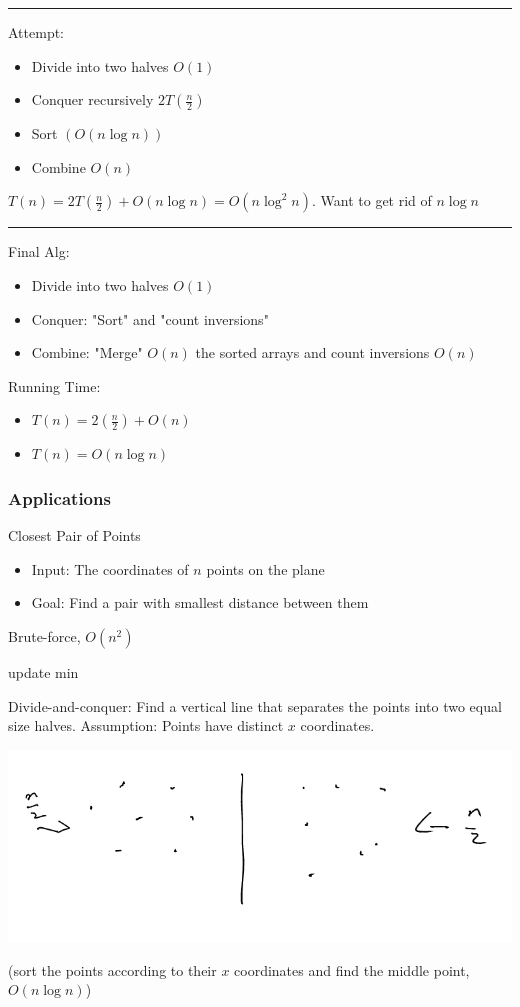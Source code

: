 \documentclass[11pt]{article}
\begin{document}
\noindent\rule{\textwidth}{0.5pt}
Attempt: 
\begin{itemize}
\item Divide into two halves \(O(1)\)
\item Conquer recursively \(2T(\frac{n}{2})\)
\item Sort \((O(n\log n))\)
\item Combine \(O(n)\)
\end{itemize}
\(T(n)=2T(\frac{n}{2})+O(n \log n)=O(n \log^2 n)\). Want to get rid of \(n \log n\)

\noindent\rule{\textwidth}{0.5pt}
Final Alg:
\begin{itemize}
\item Divide into two halves \(O(1)\)
\item Conquer: "Sort" and "count inversions"
\item Combine: "Merge" \(O(n)\) the sorted arrays and count inversions \(O(n)\)
\end{itemize}
Running Time:
\begin{itemize}
\item \(T(n)=2(\frac{n}{2})+O(n)\)
\item \(T(n)=O(n \log n)\)
\end{itemize}
\subsubsection{Applications}
\label{sec:org0646a00}
Closest Pair of Points
\begin{itemize}
\item Input: The coordinates of \(n\) points on the plane
\item Goal: Find a pair with smallest distance between them
\end{itemize}
Brute-force, \(O(n^2)\)
\begin{algorithmic}
	 update min
	\EndIf
    \EndFor
\EndFor
\end{algorithmic}
Divide-and-conquer:
Find a vertical line that separates the points into two equal size halves.
Assumption: Points have distinct \(x\) coordinates. 
\begin{center}
\includegraphics[width=.9\linewidth]{./Images/i75.png}
\end{center}
(sort the points according to their \(x\) coordinates and find the middle point, \(O(n\log n)\))
\end{document}
